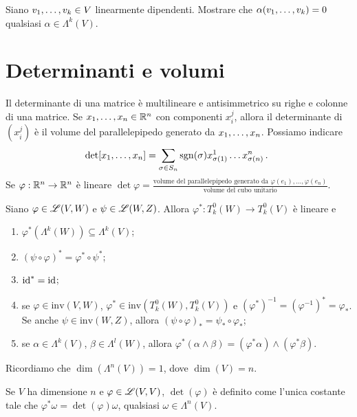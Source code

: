 \begin{exercise}
	Siano $\seqb vk, \in V$ linearmente dipendenti. Mostrare che $\alpha(\seqb vk,) = 0$ qualsiasi $\alpha\in\Lambda^k(V)$. 
\end{exercise}


\section{Determinanti e volumi}

Il determinante di una matrice è multilineare e antisimmetrico su righe e colonne di una matrice.
Se $\seqb xn, \in\R^n$ con componenti $x_i^j$, allora il determinante di $(x_i^j)$ è il volume del parallelepipedo generato da $\seqb xn,$.
Possiamo indicare
\begin{equation*}
	\det[\seqb xn,] = \sum_{\sigma\in S_n} \sgn(\sigma) x_{\sigma(1)}^1\ldots x_{\sigma(n)}^n \punto
\end{equation*}
Se $\varphi:\R^n\to\R^n$ è lineare $\det\varphi = \frac{\text{volume del parallelepipedo generato da $\varphi(e_1),\ldots,\varphi(e_n)$}}{\text{volume del cubo unitario}}$.

\begin{proposition}
	Siano $\varphi\in\Lin(V,W)$ e $\psi\in\Lin(W,Z)$. Allora $\varphi^* : T^0_k(W) \to T^0_k(V)$ è lineare e 
	\begin{enumerate}
		\item $\varphi^*(\Lambda^k(W)) \subseteq \Lambda^k(V)$;
		\item $(\psi\circ\varphi)^* = \varphi^* \circ \psi^*$;
		\item $\id^* = \id$;
		\item se $\varphi\in \mathrm{inv}(V,W)$, $\varphi^*\in \mathrm{inv}(T^0_k(W), T^0_k(V))$ e $(\varphi^*)^{-1} = (\varphi^{-1})^* = \varphi_*$.
		Se anche $\psi\in\mathrm{inv}(W,Z)$, allora $(\psi\circ\varphi)_* = \psi_*\circ \varphi_*$;
		\item se $\alpha\in\Lambda^k(V)$, $\beta\in\Lambda^l(W)$, allora $\varphi^*(\alpha\wedge\beta) = (\varphi^*\alpha) \wedge (\varphi^*\beta)$.
	\end{enumerate}
\end{proposition}

Ricordiamo che $\dim(\Lambda^n(V)) = 1$, dove $\dim(V)=n$.
\begin{definition}
	Se $V$ ha dimensione $n$ e $\varphi\in\Lin(V,V)$, $\det(\varphi)$ è definito come l'unica costante tale che $\varphi^*\omega = \det(\varphi) \omega$, qualsiasi $\omega\in\Lambda^n(V)$.
\end{definition}

